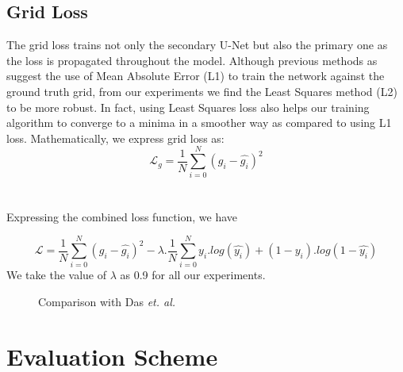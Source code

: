 \documentclass[a4paper,conference]{IEEEtran}
\begin{document}
	\subsection{Grid Loss}
	The grid loss trains not only the secondary U-Net but also the primary one as the loss is propagated throughout the model. Although previous methods as \cite{Ma-CVPR18} suggest the use of Mean Absolute Error (L1) to train the network against the ground truth grid, from our experiments we find the Least Squares method (L2) to be more robust. In fact, using Least Squares loss also helps our training algorithm to converge to a minima in a smoother way as compared to using L1 loss.
	Mathematically, we express grid loss as:
	\[
	\mathcal{L}_{g}=\frac{1}{N}\sum_{i=0}^{N}(g_{i}-\hat{g_{i}})^2
	\]
	\\
	\\
	Expressing the combined loss function, we have
	
	\[
	\mathcal{L}=\frac{1}{N}\sum_{i=0}^{N}(g_{i}-\hat{g_{i}})^{2}-\lambda.\frac{1}{N}\sum_{i=0}^{N}y_i.log(\hat{y_{i}})+(1-y_{i}).log(1-\hat{y_{i}})
	\]
	We take the value of $\lambda$ as 0.9 for all our experiments.
	
	\begin{figure}
		\centering
		
		\caption{Comparison with Das \textit{et. al.}\cite{das2017common}}
	\end{figure}
	
	\section{Evaluation Scheme}
	
\end{document}
